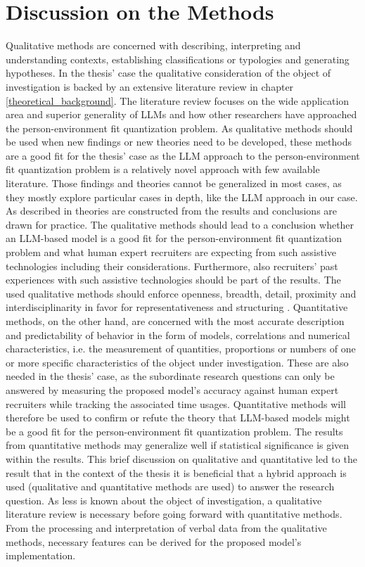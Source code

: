 \documentclass[draft,final]{thesisclass} %
\begin{document}
\section{Discussion on the Methods}
Qualitative methods are concerned with describing, interpreting and understanding contexts, establishing classifications or typologies and generating hypotheses. 
In the thesis' case the qualitative consideration of the object of investigation is backed by an extensive literature review in chapter \ref{theoretical_background}.
The literature review focuses on the wide application area and superior generality of \acs{LLM}s and how other researchers have approached the person-environment fit quantization problem.
As qualitative methods should be used when new findings or new theories need to be developed, these methods are a good fit for the thesis' case as the \acs{LLM} approach to the person-environment fit quantization problem is a relatively novel approach with few available literature.
Those findings and theories cannot be generalized in most cases, as they mostly explore particular cases in depth, like the \acs{LLM} approach in our case. 
As described in \textcite[127]{qualitative_methods} theories are constructed from the results and conclusions are drawn for practice.
The qualitative methods should lead to a conclusion whether an \acs{LLM}-based model is a good fit for the person-environment fit quantization problem and what human expert recruiters are expecting from such assistive technologies including their considerations.
Furthermore, also recruiters' past experiences with such assistive technologies should be part of the results.
The used qualitative methods should enforce openness, breadth, detail, proximity and interdisciplinarity in favor for representativeness and structuring \parencite[127]{qualitative_methods}.
Quantitative methods, on the other hand, are concerned with the most accurate description and predictability of behavior in the form of models, correlations and numerical characteristics, i.e. the measurement of quantities, proportions or numbers of one or more specific characteristics of the object under investigation.
These are also needed in the thesis' case, as the subordinate research questions can only be answered by measuring the proposed model's accuracy against human expert recruiters while tracking the associated time usages.
Quantitative methods will therefore be used to confirm or refute the theory that \acs{LLM}-based models might be a good fit for the person-environment fit quantization problem.
The results from quantitative methods may generalize well if statistical significance is given within the results.
This brief discussion on qualitative and quantitative led to the result that in the context of the thesis it is beneficial that a hybrid approach is used (qualitative and quantitative methods are used) to answer the research question.
As less is known about the object of investigation, a qualitative literature review is necessary before going forward with quantitative methods. 
From the processing and interpretation of verbal data from the qualitative methods, necessary features can be derived for the proposed model's implementation.
\end{document}
